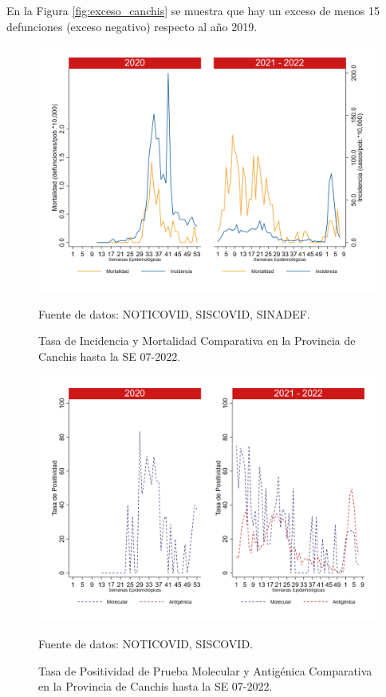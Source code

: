 \documentclass[12pt,a4paper,openany]{book}
\begin{document}
		En la Figura \ref{fig:exceso_canchis} se muestra que hay un exceso de menos 15 defunciones (exceso negativo) respecto al año 2019.
		
		\begin{figure}[h]
			\caption{Tasa de Incidencia y Mortalidad Comparativa en la Provincia de Canchis hasta la SE 07-2022.}\label{fig:inc_mort_canchis}
			\begin{center}
				\includegraphics[width=0.7\linewidth]{../figuras/incidencia_mortalidad_20_21_5.png}
			\end{center}
			{\footnotesize {Fuente de datos: NOTICOVID, SISCOVID, SINADEF.}}
		\end{figure}
		
		\begin{figure}[h]
			\caption{Tasa de Positividad de Prueba Molecular y Antigénica Comparativa en la Provincia de Canchis hasta la SE 07-2022.}\label{fig:positividad_canchis}
			\begin{center}
				\includegraphics[width=0.7\linewidth]{../figuras/positividad_20_21_5.png}
			\end{center}
			{\footnotesize {Fuente de datos: NOTICOVID, SISCOVID.}}
		\end{figure}
		
\end{document}
